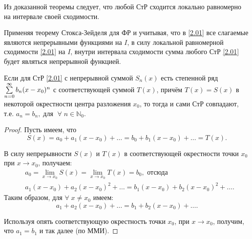 \begin{notes}
	\item Из доказанной теоремы следует, что любой СтР сходится локально равномерно на интервале своей сходимости.

	\item Применяя теорему Стокса-Зейделя для ФР и учитывая, что в \eqref{2.01} все слагаемые являются непрерывными функциями на $ I $,
	в силу локальной равномерной сходимости \eqref{2.01} на $ I $, внутри интервала сходимости сумма любого СтР \eqref{2.01}  будет являться непрерывной функцией.
\end{notes}
\begin{consequence}
	Если для СтР \eqref{2.01} с непрерывной суммой $ S_n(x) $ есть степенной ряд
	$ \sum\limits_{n=0}^{\infty} b_n (x-x_0)^n $ с соответствующей суммой $ T(x) $, причём $ T(x) = S(x) $ в некоторой окрестности центра разложения \nolinebreak$ x_0 $, то тогда и сами СтР совпадают,
	т.е. $ a_n = b_n, \; \text{для } \; \forall \; n \in \mathbb{N}_0 $.
\end{consequence}

\begin{proof} Пусть имеем, что
	\begin{equation*}
	S(x) = a_0 + a_1 (x-x_0) + \ldots = b_0 + b_1 (x-x_0) + \ldots = T(x).
	\end{equation*}

	В силу непрерывности $ S(x) $ и $ T(x) $ в соответствующей окрестности точки $ x_0 $ при
	$ x \to x_0 $, получаем:
	\begin{equation*}
	\begin{split}
	& a_0 = \lim\limits_{x\to x_0} S(x) = \lim\limits_{x\to x_0} T(x) = b_0, \text{ отсюда }\\
	& a_1 (x-x_0) + a_2(x-x_0)^2 + \ldots = b_1 (x-x_0) + b_2(x-x_0)^2 + \ldots.
	\end{split}
	\end{equation*}
	Таким образом, для $ \forall \; x \neq x_0 $ имеем:
	\begin{equation*}
	a_1 + a_2(x-x_0)  + \ldots =  b_1 + b_2(x-x_0) + \ldots.
	\end{equation*}

	Используя опять соответствующую окрестность точки $ x_0 $, при $ x \to x_0 $, получим, что
	$ a_1 = b_1 $ и так далее (по ММИ).
\end{proof}
